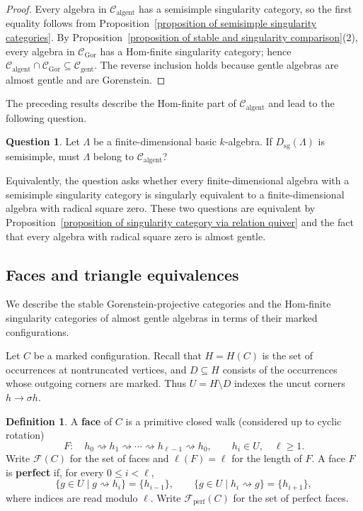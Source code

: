 \documentclass[11pt]{article}
\providecommand{\varLambda}{\Lambda}
\theoremstyle{definition}
\newtheorem{definition}[theorem]{Definition}
\newtheorem{question}[theorem]{Question}
\begin{document}
		\begin{proof}
			Every algebra in $\mathcal C_{\mathrm{algent}}$ has a semisimple singularity category, so the first equality follows from Proposition~\ref{proposition of semisimple singularity categories}. By Proposition~\ref{proposition of stable and singularity comparison}(2), every algebra in $\mathcal C_{\mathrm{Gor}}$ has a Hom-finite singularity category; hence $\mathcal C_{\mathrm{algent}}\cap\mathcal C_{\mathrm{Gor}}\subseteq\mathcal C_{\mathrm{gent}}$. The reverse inclusion holds because gentle algebras are almost gentle and are Gorenstein.
		\end{proof}
    


		The preceding results describe the Hom-finite part of $\mathcal C_{\mathrm{algent}}$ and lead to the following question.

		\begin{question}\label{question of semisimple singularity classes}
			Let $\varLambda$ be a finite-dimensional basic $k$-algebra.
			If $D_{\mathrm{sg}}(\varLambda)$ is semisimple, must $\varLambda$ belong to $\mathcal C_{\mathrm{algent}}$?
		\end{question}

		Equivalently, the question asks whether every finite-dimensional algebra with a semisimple singularity category is singularly equivalent to a finite-dimensional algebra with radical square zero.
		These two questions are equivalent by Proposition~\ref{proposition of singularity category via relation quiver} and the fact that every algebra with radical square zero is almost gentle.

	\subsection{Faces and triangle equivalences}

		We describe the stable Gorenstein-projective categories and the Hom-finite singularity categories of almost gentle algebras in terms of their marked configurations. 

		Let $C$ be a marked configuration. Recall that $H=H(C)$ is the set of occurrences at nontruncated vertices, and $D\subseteq H$ consists of the occurrences whose outgoing corners are marked. Thus $U=H\setminus D$ indexes the uncut corners $h\to\sigma h$.


		\begin{definition}\label{definition of relation face}
			A \textbf{face} of $C$ is a primitive closed walk (considered up to cyclic rotation)
			\[
				F:\quad h_0\rightsquigarrow h_1\rightsquigarrow\cdots
				\rightsquigarrow h_{\ell-1}\rightsquigarrow h_0,
				\qquad h_i\in U,\quad \ell\geq1.
			\]
			Write $\mathcal F(C)$ for the set of faces and $\ell(F)=\ell$ for the length of $F$. 
			A face $F$ is \textbf{perfect} if, for every $0\leq i<\ell$,
			\[
				\{g\in U\mid g\rightsquigarrow h_i\}=\{h_{i-1}\},
				\qquad
				\{g\in U\mid h_i\rightsquigarrow g\}=\{h_{i+1}\},
			\]
			where indices are read modulo $\ell$. Write $\mathcal F_{\mathrm{perf}}(C)$ for the set of perfect faces.
		\end{definition}
\end{document}
